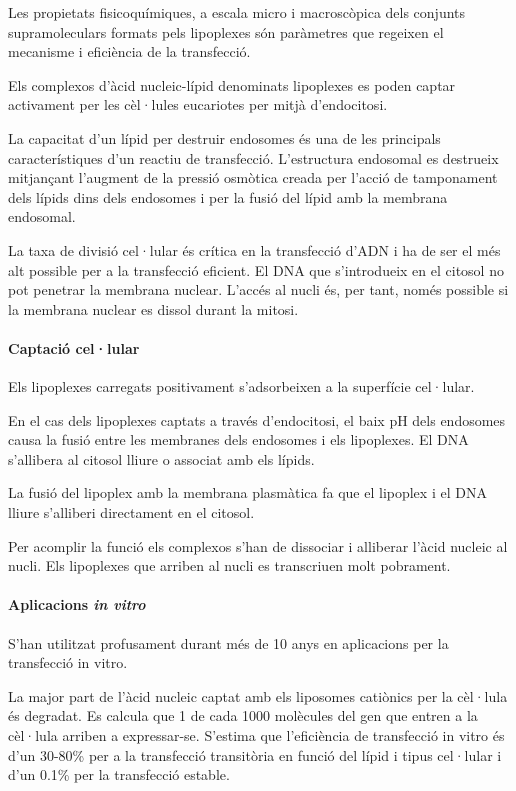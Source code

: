Les propietats fisicoquímiques, a escala micro i macroscòpica dels conjunts supramoleculars formats pels lipoplexes són paràmetres que regeixen el mecanisme i eficiència de la transfecció.

Els complexos d'àcid nucleic-lípid denominats lipoplexes es poden captar activament per les cèl·lules eucariotes per mitjà d'endocitosi.

La capacitat d'un lípid per destruir endosomes és una de les principals característiques d'un reactiu de transfecció. L'estructura endosomal es destrueix mitjançant l'augment de la pressió osmòtica creada per l'acció de tamponament dels lípids dins dels endosomes i per la fusió del lípid amb la membrana endosomal.

La taxa de divisió cel·lular és crítica en la transfecció d'ADN i ha de ser el més alt possible per a la transfecció eficient. El DNA que s'introdueix en el citosol no pot penetrar la membrana nuclear. L'accés al nucli és, per tant, només possible si la membrana nuclear es dissol durant la mitosi.

\paragraph{Captació cel·lular}
Els lipoplexes carregats positivament s'adsorbeixen a la superfície cel·lular.

En el cas dels lipoplexes captats a través d'endocitosi, el baix pH dels endosomes causa la fusió entre les membranes dels endosomes i els lipoplexes. El DNA s'allibera al citosol lliure o associat amb els lípids.

La fusió del lipoplex amb la membrana plasmàtica fa que el lipoplex i el DNA lliure s'alliberi directament en el citosol.

Per acomplir la funció els complexos s'han de dissociar i alliberar l'àcid nucleic al nucli. Els lipoplexes que arriben al nucli es transcriuen molt pobrament.

\paragraph{Aplicacions \textit{in vitro}}
S'han utilitzat profusament durant més de 10 anys en aplicacions per la transfecció in vitro.

La major part de l'àcid nucleic captat amb els liposomes catiònics per la cèl·lula és degradat. Es calcula que 1 de cada 1000 molècules del gen que entren a la cèl·lula arriben a expressar-se. S'estima que l'eficiència de transfecció in vitro és d'un 30-80\% per a la transfecció transitòria en funció del lípid i tipus cel·lular i d'un 0.1\% per la transfecció estable.

